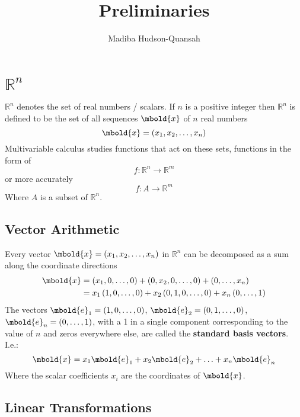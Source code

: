 \documentclass[12pt letter]{report}
\title{\Huge{Preliminaries}}
\author{\huge{Madiba Hudson-Quansah}}
\date{}
\begin{document}
\maketitle
\newpage
{}
\tableofcontents
\pagebreak

\chapter{$\mathbb{R}^{n}$}

$\mathbb{R}^{n}$ denotes the set of real numbers / scalars. If $n$ is a positive integer then $\mathbb{R}^{n}$ is
defined to be the set of all sequences $\mbold{x}$ of $n$ real numbers
\[
  \mbold{x} = \left( x_1, x_2, \ldots, x_n \right)
\]
Multivariable calculus studies functions that act on these sets, functions in the form of
\[
  f : \mathbb{R}^{n} \to  \mathbb{R}^{m}
\]
or more accurately
\[
  f : A \to \mathbb{R}^{m}
\]
Where $A$ is a subset of $\mathbb{R}^{n}$.

\section{Vector Arithmetic}

Every vector $\mbold{x} = \left( x_1,x_2, \ldots, x_n \right) $ in $\mathbb{R}^{n}$ can be decomposed as a sum along the
coordinate directions
\begin{align*}
  \mbold{x} & = \left( x_1, 0, \ldots, 0 \right) + \left( 0, x_2, 0, \ldots, 0 \right)  + \left( 0, \ldots, x_n \right)
  \\
            & = x_1 \left( 1, 0, \ldots, 0 \right) + x_2 \left( 0, 1, 0, \ldots, 0 \right) + x_n \left( 0, \ldots, 1 \right) \\
\end{align*}
The vectors $ \mbold{e}_1 = \left( 1, 0, \ldots, 0 \right) $, $\mbold{e}_2 = \left( 0,1,\ldots, 0 \right) $,
$\mbold{e}_n = \left( 0, \ldots, 1 \right) $, with a 1 in a single component corresponding to the value of $n$ and zeros
everywhere else, are called the \textbf{standard basis vectors}. I.e.:
\[
  \mbold{x} = x_1\mbold{e}_1 + x_2\mbold{e}_2 + \ldots + x_n\mbold{e}_n
\]
Where the scalar coefficients $x_i$ are the coordinates of $\mbold{x}$.

\section{Linear Transformations}
\end{document}
